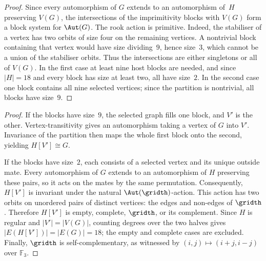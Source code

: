 
\begin{proof}
Since every automorphism of $G$ extends to an automorphism of~$H$
preserving $V(G)$, the intersections of the imprimitivity blocks
with $V(G)$ form a block system for $\Aut(G)$. The rook action is
primitive. Indeed, the stabiliser of a vertex has two orbits of
size four on the remaining vertices. A nontrivial block containing
that vertex would have size dividing~$9$, hence size~$3$, which
cannot be a union of the stabiliser orbits.
Thus the intersections are either singletons or all of $V(G)$.
In the first case at least nine host blocks are needed, and since
$|H|=18$ and every block has size at least two, all have size~$2$.
In the second case one block contains all nine selected vertices;
since the partition is nontrivial, all blocks have size~$9$.
\end{proof}

\begin{proof}
If the blocks have size~$9$, the selected graph fills one block,
and $V'$ is the other. Vertex-transitivity gives an automorphism
taking a vertex of $G$ into $V'$. Invariance of the partition then
maps the whole first block onto the second, yielding
$H[V']\cong G$.

If the blocks have size~$2$, each consists of a selected vertex
and its unique outside mate. Every automorphism of $G$ extends to
an automorphism of $H$ preserving these pairs, so it acts on the
mates by the same permutation. Consequently, $H[V']$ is invariant
under the natural $\Aut(\gridth)$-action. This action has two
orbits on unordered pairs of distinct vertices: the edges and
non-edges of $\gridth$. Therefore $H[V']$ is empty, complete,
$\gridth$, or its complement. Since $H$ is regular and
$|V'|=|V(G)|$, counting degrees over the two halves gives
$|E(H[V'])|=|E(G)|=18$; the empty and complete cases are excluded.
Finally, $\gridth$ is self-complementary, as witnessed by
$(i,j)\mapsto(i+j,i-j)$ over $\mathbb F_3$.
\end{proof}
